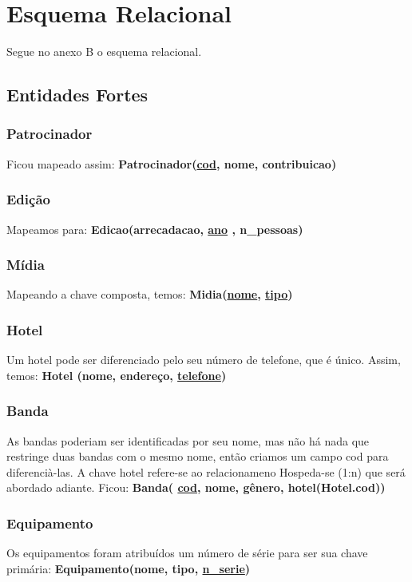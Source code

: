 \documentclass[12pt]{article}
\begin{document}
\section{Esquema Relacional}
Segue no anexo B o esquema relacional.
\subsection{Entidades Fortes}
\subsubsection{Patrocinador}
Ficou mapeado assim: \textbf{Patrocinador(\underline{cod}, nome, contribuicao)}

\subsubsection{Edição}
Mapeamos para: \textbf{Edicao(arrecadacao, \underline{ano} , n\_pessoas)}


\subsubsection{Mídia}
Mapeando a chave composta, temos: \textbf{Midia(\underline{nome}, \underline{tipo})}

\subsubsection{Hotel}
Um hotel pode ser diferenciado pelo seu número de telefone, que é único. Assim, temos: \textbf{Hotel (nome, endereço, \underline{telefone})}	

\subsubsection{Banda}
As bandas poderiam ser identificadas por seu nome, mas não há nada que restringe duas bandas com o mesmo nome, então criamos um campo cod para diferencià-las. A chave hotel refere-se ao relacionameno Hospeda-se (1:n) que será abordado adiante. Ficou: \textbf{Banda( \underline{cod}, nome, gênero, hotel(Hotel.cod))}

\subsubsection{Equipamento}
Os equipamentos foram atribuídos um número de série para ser sua chave primária: 
\textbf{Equipamento(nome, tipo, \underline{n\_serie})}
\end{document}
